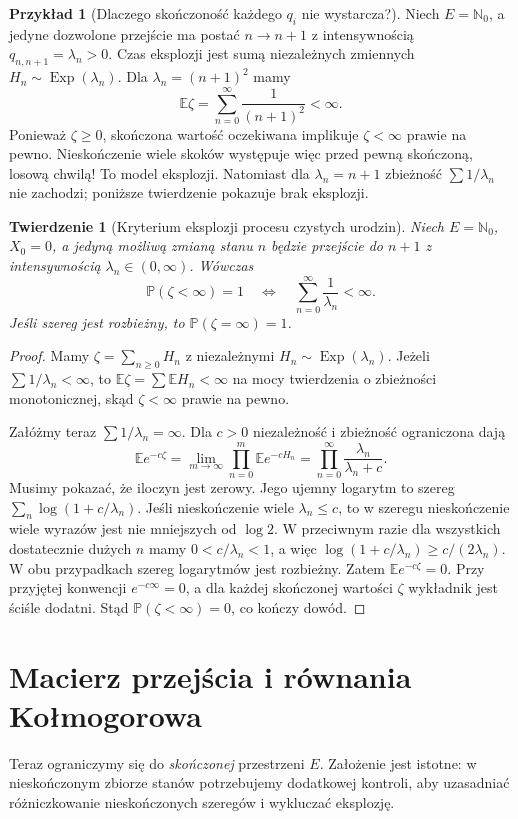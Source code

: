 \documentclass[11pt,a4paper,oneside]{report}
\numberwithin{equation}{chapter}
\theoremstyle{plain}
\newtheorem{twierdzenie}{Twierdzenie}[chapter]
\theoremstyle{definition}
\newtheorem{przyklad}{Przykład}[chapter]
\theoremstyle{remark}
\newcommand{\N}{\mathbb{N}}
\newcommand{\Prob}{\mathbb{P}}
\newcommand{\E}{\mathbb{E}}
\begin{document}
\begin{przyklad}[Dlaczego skończoność każdego $q_i$ nie wystarcza?]
Niech $E=\N_0$, a jedyne dozwolone przejście ma postać
$n\to n+1$ z intensywnością $q_{n,n+1}=\lambda_n>0$.
Czas eksplozji jest sumą niezależnych zmiennych
$H_n\sim\operatorname{Exp}(\lambda_n)$.
Dla $\lambda_n=(n+1)^2$ mamy
\[
\E\zeta=\sum_{n=0}^\infty\frac1{(n+1)^2}<\infty.
\]
Ponieważ $\zeta\ge0$, skończona wartość oczekiwana
implikuje $\zeta<\infty$ prawie na pewno.
Nieskończenie wiele skoków występuje więc przed pewną
skończoną, losową chwilą! To model eksplozji.
Natomiast dla $\lambda_n=n+1$ zbieżność $\sum1/\lambda_n$
nie zachodzi; poniższe twierdzenie pokazuje brak eksplozji.
\end{przyklad}

\begin{twierdzenie}[Kryterium eksplozji procesu czystych urodzin]
\label{thm:pure-birth-explosion}
Niech $E=\N_0$, $X_0=0$, a jedyną możliwą zmianą stanu
$n$ będzie przejście do $n+1$ z intensywnością
$\lambda_n\in(0,\infty)$. Wówczas
\[
\Prob(\zeta<\infty)=1
\quad\Longleftrightarrow\quad
\sum_{n=0}^\infty\frac1{\lambda_n}<\infty.
\]
Jeśli szereg jest rozbieżny, to $\Prob(\zeta=\infty)=1$.
\end{twierdzenie}
\begin{proof}
Mamy $\zeta=\sum_{n\ge0}H_n$ z niezależnymi
$H_n\sim\operatorname{Exp}(\lambda_n)$.
Jeżeli $\sum1/\lambda_n<\infty$, to
$\E\zeta=\sum\E H_n<\infty$ na mocy twierdzenia o
zbieżności monotonicznej, skąd $\zeta<\infty$ prawie na pewno.

Załóżmy teraz $\sum1/\lambda_n=\infty$.
Dla $c>0$ niezależność i zbieżność ograniczona dają
\[
\E e^{-c\zeta}
=\lim_{m\to\infty}\prod_{n=0}^m\E e^{-cH_n}
=\prod_{n=0}^\infty\frac{\lambda_n}{\lambda_n+c}.
\]
Musimy pokazać, że iloczyn jest zerowy. Jego ujemny logarytm
to szereg $\sum_n\log(1+c/\lambda_n)$.
Jeśli nieskończenie wiele $\lambda_n\le c$, to w szeregu
nieskończenie wiele wyrazów jest nie mniejszych od $\log2$.
W przeciwnym razie dla wszystkich dostatecznie dużych $n$
mamy $0<c/\lambda_n<1$, a więc
$\log(1+c/\lambda_n)\ge c/(2\lambda_n)$.
W obu przypadkach szereg logarytmów jest rozbieżny.
Zatem $\E e^{-c\zeta}=0$.
Przy przyjętej konwencji $e^{-c\infty}=0$, a dla każdej
skończonej wartości $\zeta$ wykładnik jest ściśle dodatni.
Stąd $\Prob(\zeta<\infty)=0$, co kończy dowód.
\end{proof}

\section{Macierz przejścia i równania Kołmogorowa}
Teraz ograniczymy się do \emph{skończonej} przestrzeni $E$.
Założenie jest istotne: w nieskończonym zbiorze stanów
potrzebujemy dodatkowej kontroli, aby uzasadniać różniczkowanie
nieskończonych szeregów i wykluczać eksplozję.
\end{document}

